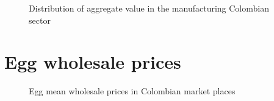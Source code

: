 \documentclass[
  ignorenonframetext,
]{beamer}
\begin{document}
\begin{frame}{}
\label{section-14}
\begin{figure}


\caption{\label{fig-manufacturing-sector-col}Distribution of aggregate
value in the manufacturing Colombian sector}

\end{figure}%
\end{frame}

\section{Egg wholesale prices}\label{egg-wholesale-prices}

\begin{frame}{}
\label{section-15}
\begin{figure}


\caption{\label{fig-egg-wholesale-prices-col}Egg mean wholesale prices
in Colombian market places}

\end{figure}%
\end{frame}
\end{document}
